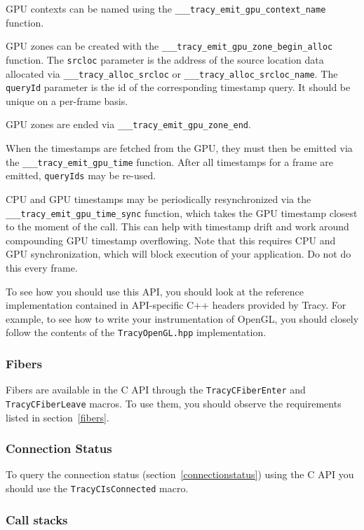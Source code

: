 \documentclass[hidelinks,titlepage,a4paper,twoside]{article}
\begin{document}
GPU contexts can be named using the \texttt{\_\_\_tracy\_emit\_gpu\_context\_name} function.

GPU zones can be created with the \texttt{\_\_\_tracy\_emit\_gpu\_zone\_begin\_alloc} function. The \texttt{srcloc} parameter is the address of the source location data allocated via \texttt{\_\_\_tracy\_alloc\_srcloc} or \texttt{\_\_\_tracy\_alloc\_srcloc\_name}. The \texttt{queryId} parameter is the id of the corresponding timestamp query. It should be unique on a per-frame basis.

GPU zones are ended via \texttt{\_\_\_tracy\_emit\_gpu\_zone\_end}.

When the timestamps are fetched from the GPU, they must then be emitted via the \texttt{\_\_\_tracy\_emit\_gpu\_time} function. After all timestamps for a frame are emitted, \texttt{queryIds} may be re-used.

CPU and GPU timestamps may be periodically resynchronized via the \texttt{\_\_\_tracy\_emit\_gpu\_time\_sync} function, which takes the GPU timestamp closest to the moment of the call. This can help with timestamp drift and work around compounding GPU timestamp overflowing. Note that this requires CPU and GPU synchronization, which will block execution of your application. Do not do this every frame.

To see how you should use this API, you should look at the reference implementation contained in API-specific C++ headers provided by Tracy. For example, to see how to write your instrumentation of OpenGL, you should closely follow the contents of the \texttt{TracyOpenGL.hpp} implementation.

\subsubsection{Fibers}

Fibers are available in the C API through the \texttt{TracyCFiberEnter} and \texttt{TracyCFiberLeave} macros. To use them, you should observe the requirements listed in section~\ref{fibers}.

\subsubsection{Connection Status}

To query the connection status (section~\ref{connectionstatus}) using the C API you should use the \texttt{TracyCIsConnected} macro.

\subsubsection{Call stacks}
\end{document}
